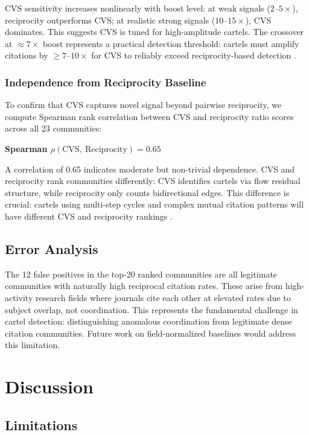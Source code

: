 \documentclass[11pt,letterpaper]{article}
\begin{document}
CVS sensitivity increases nonlinearly with boost level: at weak signals ($2$--$5\times$), reciprocity outperforms CVS; at realistic strong signals ($10$--$15\times$), CVS dominates. This suggests CVS is tuned for high-amplitude cartels. The crossover at $\approx 7\times$ boost represents a practical detection threshold: cartels must amplify citations by $\geq 7$--$10\times$ for CVS to reliably exceed reciprocity-based detection \citep{Newman2003}.

\subsubsection*{Independence from Reciprocity Baseline}

To confirm that CVS captures novel signal beyond pairwise reciprocity, we compute Spearman rank correlation between CVS and reciprocity ratio scores across all 23 communities:

\textbf{Spearman $\rho(\mathrm{CVS},~\mathrm{Reciprocity}) = 0.65$}

A correlation of 0.65 indicates moderate but non-trivial dependence. CVS and reciprocity rank communities differently: CVS identifies cartels via flow residual structure, while reciprocity only counts bidirectional edges. This difference is crucial: cartels using multi-step cycles and complex mutual citation patterns will have different CVS and reciprocity rankings \citep{Priem2022}.

\subsection{Error Analysis}

The 12 false positives in the top-20 ranked communities are all legitimate communities with naturally high reciprocal citation rates. These arise from high-activity research fields where journals cite each other at elevated rates due to subject overlap, not coordination. This represents the fundamental challenge in cartel detection: distinguishing anomalous coordination from legitimate dense citation communities. Future work on field-normalized baselines would address this limitation.

\section{Discussion}

\subsection{Limitations}
\end{document}
